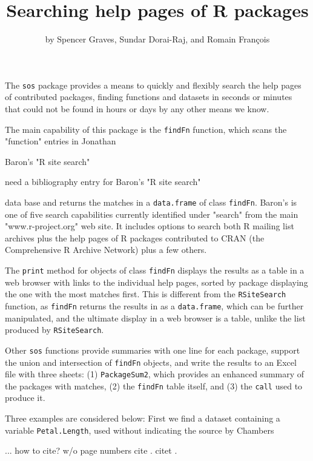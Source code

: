 \title{Searching help pages of R packages}
\author{by Spencer Graves, Sundar Dorai-Raj, and Romain Fran{\c c}ois}

\maketitle

The {\tt sos} package provides a means to quickly and flexibly
search the help pages of contributed packages, finding
functions and datasets in seconds or minutes that could not be
found in hours or days by any other means we know.

The main capability of this package is the {\tt findFn} function,
which scans the "function" entries in Jonathan

Baron's "R site search"

need a bibliography entry for Baron's "R site search"

data base and returns the matches in a
{\tt data.frame} of class {\tt findFn}.  Baron's is one of five
search capabilities currently identified under "search" from the
main "www.r-project.org" web site.  It includes options to
search both R mailing list archives plus the help pages of
R packages contributed to CRAN (the Comprehensive R Archive
Network) plus a few others.

The {\tt print} method for objects of class {\tt findFn}
displays the results as a table in a web
browser with links to the individual help pages, sorted by package
displaying the one with the most matches first.  This is different
from the {\tt RSiteSearch} function, as {\tt findFn} returns
the results in \R{} as a {\tt data.frame}, which can be further
manipulated, and the ultimate display in a web browser is a
table, unlike the list produced by {\tt RSiteSearch}.

Other {\tt sos} functions provide summaries with one line for each
package, support the union and intersection of {\tt findFn} objects,
and write the results to an Excel file with three sheets:  (1)
{\tt PackageSum2}, which provides an enhanced summary of the packages
with matches, (2) the {\tt findFn} table itself, and (3) the {\tt call}
used to produce it.

Three examples are considered below:  First we find a dataset
containing a variable {\tt Petal.Length}, used without indicating
the source by Chambers

... how to cite?
w/o page numbers
cite \cite{JC09}.
citet \citet{JC09}.

